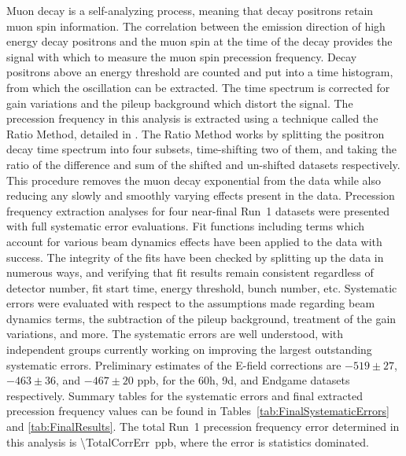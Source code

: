 Muon decay is a self-analyzing process, meaning that decay positrons retain muon spin information. The correlation between the emission direction of high energy decay positrons and the muon spin at the time of the decay provides the signal with which to measure the muon spin precession frequency. Decay positrons above an energy threshold are counted and put into a time histogram, from which the \wa oscillation can be extracted. The time spectrum is corrected for gain variations and the pileup background which distort the \gmtwo signal. The precession frequency in this analysis is extracted using a technique called the Ratio Method, detailed in . The Ratio Method works by splitting the positron decay time spectrum into four subsets, time-shifting two of them, and taking the ratio of the difference and sum of the shifted and un-shifted datasets respectively. This procedure removes the muon decay exponential from the data while also reducing any slowly and smoothly varying effects present in the data. Precession frequency extraction analyses for four near-final Run~1 datasets were presented with full systematic error evaluations. Fit functions including terms which account for various beam dynamics effects have been applied to the data with success. The integrity of the fits have been checked by splitting up the data in numerous ways, and verifying that fit results remain consistent regardless of detector number, fit start time, energy threshold, bunch number, etc. Systematic errors were evaluated with respect to the assumptions made regarding beam dynamics terms, the subtraction of the pileup background, treatment of the gain variations, and more. The systematic errors are well understood, with independent groups currently working on improving the largest outstanding systematic errors. Preliminary estimates of the E-field corrections are $-519 \pm 27$, $-463 \pm 36$, and $-467 \pm 20$\xspace ppb, for the 60h, 9d, and Endgame datasets respectively. Summary tables for the systematic errors and final extracted precession frequency values can be found in Tables~\ref{tab:FinalSystematicErrors} and \ref{tab:FinalResults}. The total Run~1 precession frequency error determined in this analysis is \SI{\TotalCorrErr}{ppb}, where the error is statistics dominated.


